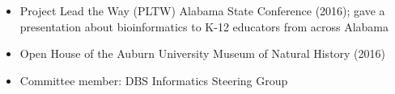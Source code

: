 \begin{itemize}
    \item Project Lead the Way (PLTW) Alabama State Conference (2016); gave a
        presentation about bioinformatics to K-12 educators from across Alabama
    \item Open House of the Auburn University Museum of Natural History (2016)
    \item Committee member: DBS Informatics Steering Group
\end{itemize}
